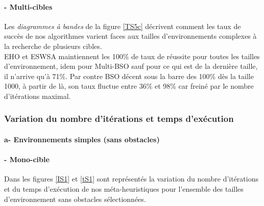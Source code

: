 	
	\noindent
	\begin{minipage}[t]{0.5\textwidth}
		\paragraph{- Multi-cibles}
		\textbf{}
		
		Les \textit{diagrammes à bandes} de la figure \ref{TS5c} décrivent comment les taux de succès de nos algorithmes varient faces aux tailles d'environnements complexes à la recherche de plusieurs cibles.\\
		
		EHO et ESWSA maintiennent les 100\% de taux de réussite pour toutes les tailles d'environnement, idem pour Multi-BSO sauf pour ce qui est de la dernière taille, il n'arrive qu'à 71\%. Par contre BSO décent sous la barre des 100\% dès la taille 1000, à partir de là, son taux fluctue entre 36\% et 98\% car freiné par le nombre d'itérations maximal.
		
	\end{minipage}\hfill
	\begin{minipage}[t]{0.55\textwidth}
		\captionsetup{width=0.8\linewidth}
		\centering{}
		\label{TS5c}
	\end{minipage}\hfill
	
	
	
	\subsubsection{Variation du nombre d'itérations et temps d'exécution}
	\paragraph{a- Environnements simples (sans obstacles)}
	\textbf{}
	\vspace{-0.3cm}
	\noindent
	\paragraph{- Mono-cible}
	\textbf{ }
	
	Dans les figures \ref{IS1} et \ref{tS1} sont représentés la variation du nombre d'itérations et du temps d'exécution de nos méta-heuristiques pour l'ensemble des tailles d'environnement sans obstacles sélectionnées.\\
	\vspace{-0.2cm}
	
